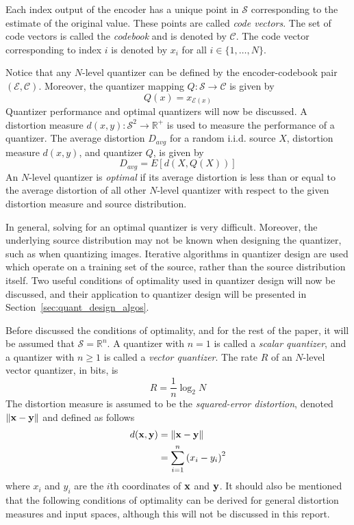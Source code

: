 \documentclass[10pt]{article}
\begin{document}
Each index output of the encoder has a unique point in $\mathcal{S}$ corresponding to the estimate of the original value. These points are called \emph{code vectors}. The set of code vectors is called the \emph{codebook} and is denoted by $\mathcal{C}$. The code vector corresponding to index $i$ is denoted by $x_i$ for all $i \in \{1,\ldots,N\}$.

Notice that any $N$-level quantizer can be defined by the encoder-codebook pair $(\mathcal{E}, \mathcal{C})$. Moreover, the quantizer mapping $Q : \mathcal{S} \rightarrow \mathcal{C}$ is given by
\begin{equation}
Q(x) = x_{\mathcal{E}(x)}
\end{equation}
Quantizer performance and optimal quantizers will now be discussed. A distortion measure $d(x,y) : \mathcal{S}^2 \rightarrow \mathbb{R}^+$ is used to measure the performance of a quantizer. The average distortion $D_{avg}$ for a random i.i.d. source $X$, distortion measure $d(x,y)$, and quantizer $Q$, is given by
\begin{equation}
  \label{eq:D_avg}
D_{avg} = E[d(X,Q(X))]
\end{equation}
An $N$-level quantizer is \emph{optimal} if its average distortion is less than or equal to the average distortion of all other $N$-level quantizer with respect to the given distortion measure and source distribution.

In general, solving for an optimal quantizer is very difficult. Moreover, the underlying source distribution may not be known when designing the quantizer, such as when quantizing images. Iterative algorithms in quantizer design are used which operate on a training set of the source, rather than the source distribution itself. Two useful conditions of optimality used in quantizer design will now be discussed, and their application to quantizer design will be presented in Section~\ref{sec:quant_design_algos}.

Before discussed the conditions of optimality, and for the rest of the paper, it will be assumed that $\mathcal{S}=\mathbb{R}^n$. A quantizer with $n=1$ is called a \emph{scalar quantizer}, and a quantizer with $n \ge 1$ is called a \emph{vector quantizer}. The rate $R$ of an $N$-level vector quantizer, in bits, is
\begin{equation}
R = \frac{1}{n}\log_2 N
\end{equation}
The distortion measure is assumed to be the \emph{squared-error distortion}, denoted ${\bf \| x - y \|}$ and defined as follows
\begin{align}
d(\bf x, \bf y) &= {\bf \| x - y \|} \\
&= \sum_{i=1}^n{(x_i - y_i)}^2
\end{align}
where $x_i$ and $y_i$ are the $i$th coordinates of $\bf x$ and $\bf y$. It should also be mentioned that the following conditions of optimality can be derived for general distortion measures and input spaces, although this will not be discussed in this report.
\end{document}
